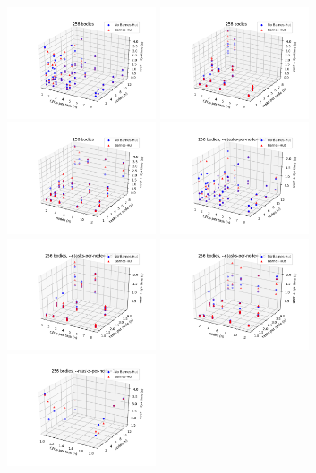 \documentclass[11pt,a4paper]{article}
\begin{document}
\includegraphics[width=4.4cm]{256-cpusPerTask-nodes}
\includegraphics[width=4.4cm]{256-cpusPerTask-tasksPerNode}
\includegraphics[width=4.4cm]{256-nodes-tasksPerNode}
\includegraphics[width=4.4cm]{256-cpusPerTask-nodes-elide_8_tpn}
\includegraphics[width=4.4cm]{256-cpusPerTask-tasksPerNode-elide_8_tpn}
\includegraphics[width=4.4cm]{256-nodes-tasksPerNode-elide_8_tpn}
\includegraphics[width=4.4cm]{256-cpusPerTask-nodes-just_1_tpn}
\end{document}
